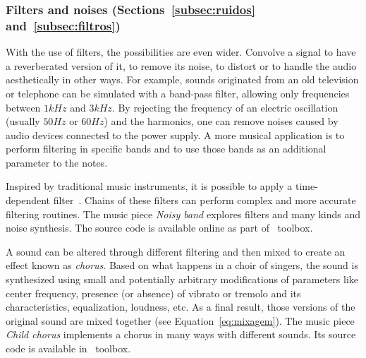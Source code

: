 \subsubsection{Filters and noises (Sections~\ref{subsec:ruidos} and~\ref{subsec:filtros})}
With the use of filters, the possibilities are even wider.
Convolve a signal to have a reverberated version of it, to remove its noise, to distort or to handle
the audio aesthetically in other ways. For example, sounds originated from an old television or telephone can be simulated with a band-pass filter, allowing only frequencies between $1kHz$ and $3kHz$. By rejecting the frequency of an electric oscillation (usually $50Hz$ or $60Hz$) and the harmonics, one can remove noises caused by audio devices connected to the power supply. A more musical application is to perform filtering in specific bands and to use those bands as an additional parameter to the notes.

Inspired by traditional music instruments, it is possible to apply a
time-dependent filter~\cite{Roederer}. Chains of these filters can perform complex and more accurate filtering routines. The music piece \emph{Noisy band} explores filters and many kinds and noise synthesis. The source code is available online as part of \massa\ toolbox.

A sound can be altered through different filtering and then mixed to create an effect known as \emph{chorus}. Based on what happens in a choir of singers, the sound is synthesized using small and potentially arbitrary modifications of parameters like center frequency, presence (or absence) of vibrato or tremolo and its characteristics, equalization, loudness, etc. As a final result, those versions of the original sound are mixed together (see Equation~\ref{eq:mixagem}). The music piece \emph{Child chorus} implements a chorus in many ways with different sounds. Its source code is available in \massa\ toolbox.

